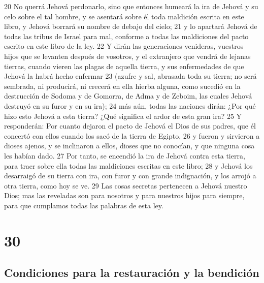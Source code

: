 20 No querrá Jehová perdonarlo, sino que entonces humeará la ira de Jehová y su celo sobre el tal hombre, y se asentará sobre él toda maldición escrita en este libro, y Jehová borrará su nombre de debajo del cielo;
21 y lo apartará Jehová de todas las tribus de Israel para mal, conforme a todas las maldiciones del pacto escrito en este libro de la ley.
22 Y dirán las generaciones venideras, vuestros hijos que se levanten después de vosotros, y el extranjero que vendrá de lejanas tierras, cuando vieren las plagas de aquella tierra, y sus enfermedades de que Jehová la habrá hecho enfermar
23 (azufre y sal, abrasada toda su tierra; no será sembrada, ni producirá, ni crecerá en ella hierba alguna, como sucedió en la destrucción de Sodoma y de Gomorra, de Adma y de Zeboim, las cuales Jehová destruyó en su furor y en su ira);
24 más aún, todas las naciones dirán: ¿Por qué hizo esto Jehová a esta tierra? ¿Qué significa el ardor de esta gran ira?
25 Y responderán: Por cuanto dejaron el pacto de Jehová el Dios de sus padres, que él concertó con ellos cuando los sacó de la tierra de Egipto,
26 y fueron y sirvieron a dioses ajenos, y se inclinaron a ellos, dioses que no conocían, y que ninguna cosa les habían dado.
27 Por tanto, se encendió la ira de Jehová contra esta tierra, para traer sobre ella todas las maldiciones escritas en este libro;
28 y Jehová los desarraigó de su tierra con ira, con furor y con grande indignación, y los arrojó a otra tierra, como hoy se ve.
29 Las cosas secretas pertenecen a Jehová nuestro Dios; mas las reveladas son para nosotros y para nuestros hijos para siempre, para que cumplamos todas las palabras de esta ley.

\chapter{30}

\section{Condiciones para la restauración y la bendición}

